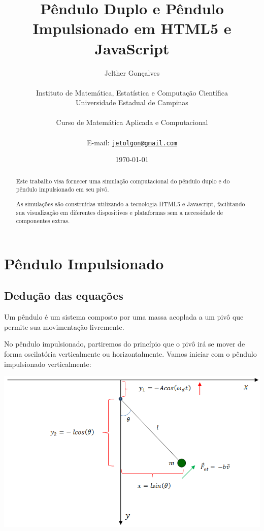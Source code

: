 \documentclass[13pt,a4paper]{report}
\begin{document}
	\title{Pêndulo Duplo e Pêndulo Impulsionado em HTML5 e JavaScript}
	\author{Jelther Gonçalves\\		
	 \\
 	 Instituto de Matemática, Estatística e Computação Científica\\
	 Universidade Estadual de Campinas\\
	 \\
	 Curso de Matemática Aplicada e Computacional\\
	 \\
	 E-mail: \texttt{\href{mailto:jetolgon@gmail.com}{jetolgon@gmail.com}}}
	\date{\today}	
	\maketitle
	
	\begin{abstract}
	
Este trabalho visa fornecer uma simulação computacional do pêndulo duplo e do pêndulo impulsionado em seu pivô.

As simulações são construídas utilizando a tecnologia HTML5 e Javascript, facilitando sua visualização em diferentes dispositivos e plataformas sem a necessidade de componentes extras.
	\end{abstract}
	
	\tableofcontents
	\clearpage

	\chapter{Pêndulo Impulsionado}	
	\section{Dedução das equações}
	
	Um pêndulo é um sistema composto por uma massa acoplada a um pivô que permite sua movimentação livremente.
	
No pêndulo impulsionado, partiremos do princípio que o pivô irá se mover de forma oscilatória verticalmente ou horizontalmente.
Vamos iniciar com o pêndulo impulsionado verticalmente:

\begin{center}
\includegraphics[scale=0.6]{figuras/esquemapenduloimpulsionado.png}
\end{center}
\clearpage
\end{document}
